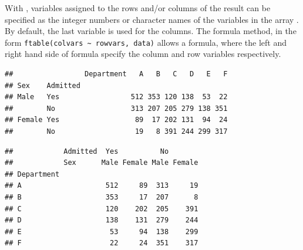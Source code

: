 \documentclass[11pt]{book}
\renewenvironment{knitrout}{\small\renewcommand{\baselinestretch}{.85}}{} %
\begin{document}
With , variables assigned to the rows and/or columns of the result
can be specified as the integer numbers or character names of the variables in
the array . By default, the last variable is used for the columns.
The formula method, in the form \verb|ftable(colvars ~ rowvars, data)|
allows a formula, where the left and right hand side of formula specify the column and row variables respectively.

\begin{knitrout}
\color{fgcolor}\begin{kframe}
\begin{alltt}
                     
\end{alltt}
\begin{verbatim}
##                 Department   A   B   C   D   E   F
## Sex    Admitted                                   
## Male   Yes                 512 353 120 138  53  22
##        No                  313 207 205 279 138 351
## Female Yes                  89  17 202 131  94  24
##        No                   19   8 391 244 299 317
\end{verbatim}
\begin{alltt}
  \hlopt{+}  \hlopt{~}     
\end{alltt}
\begin{verbatim}
##            Admitted  Yes          No       
##            Sex      Male Female Male Female
## Department                                 
## A                    512     89  313     19
## B                    353     17  207      8
## C                    120    202  205    391
## D                    138    131  279    244
## E                     53     94  138    299
## F                     22     24  351    317
\end{verbatim}
\end{kframe}
\end{knitrout}
\end{document}
